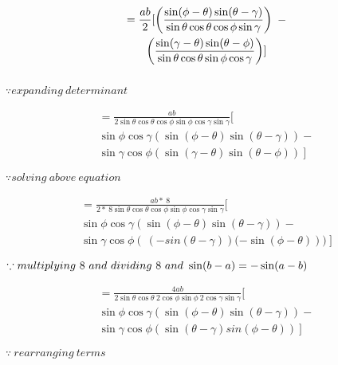 \documentclass[journal,12pt,twocolumn]{IEEEtran}
\begin{document}
\begin{multline}
    =\frac{ab}{2}[ \left(\frac{\sin(\phi-\theta)\sin(\theta-\gamma)}{\sin\theta\cos\theta\cos\phi\sin\gamma}\right)~-\\\vspace{0.3cm} \left(\frac{\sin(\gamma-\theta)\sin(\theta-\phi)}{\sin\theta\cos\theta\sin\phi\cos\gamma}\right)
    ]
\end{multline}
\begin{flushright}
$\because expanding ~ determinant $
\end{flushright}

\vspace{0.3cm}
\begin{multline}
    =\frac{ab}{2\sin\theta\cos\theta\cos\phi\sin\phi\cos\gamma\sin\gamma}[ \\ \sin\phi\cos\gamma \left(\sin(\phi-\theta)\sin(\theta-\gamma)\right) -\\ \sin\gamma\cos\phi\left(\sin(\gamma-\theta)\sin(\theta-\phi)\right)~
    ]
\end{multline}
\begin{flushright}
$\because solving~above~equation $
\end{flushright}

\vspace{0.3cm}
\begin{multline}
    =\frac{ab* ~8}{2*~8\sin\theta\cos\theta\cos\phi\sin\phi\cos\gamma\sin\gamma}[ \\ \sin\phi\cos\gamma \left(\sin(\phi-\theta)\sin(\theta-\gamma)\right) -\\ \sin\gamma\cos\phi\left(\ (-sin(\theta-\gamma))(-\sin(\phi-\theta)\right))~
    ]
\end{multline}
\begin{flushright}
$\because multiplying~8 ~and ~dividing~8 ~and \\~ \sin (b-a)=-\sin (a-b) $
\end{flushright}

\vspace{0.3cm}
\begin{multline}
    =\frac{4ab}{2\sin\theta\cos\theta~2\cos\phi\sin\phi~2\cos\gamma\sin\gamma}[ \\ \sin\phi\cos\gamma \left(\sin(\phi-\theta)\sin(\theta-\gamma)\right) -\\ \sin\gamma\cos\phi\left(\sin(\theta-\gamma)sin(\phi-\theta)\right)~
    ]
\end{multline}
\begin{flushright}
$\because ~rearranging ~terms $
\end{flushright}
\end{document}
